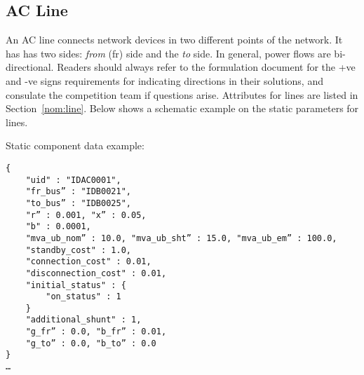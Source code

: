 \subsection{AC Line}
\label{sec:acline}
An AC line connects network devices in two different points of the network. 
It has has two sides: \emph{from} (fr) side and the \emph{to} side.
In general, power flows are bi-directional. 
Readers should always refer to the formulation document for the +ve and -ve signs
requirements for indicating directions in their solutions,
and consulate the competition team if questions arise.
Attributes for lines are listed in Section~\ref{nom:line}.
Below shows a schematic example on the static parameters for lines.

Static component data example:
\begin{verbatim}
{
    "uid" : "IDAC0001",
    "fr_bus” : "IDB0021",
    "to_bus” : "IDB0025",
    "r” : 0.001, "x” : 0.05, 
    "b" : 0.0001,
    "mva_ub_nom” : 10.0, "mva_ub_sht” : 15.0, "mva_ub_em” : 100.0,
    "standby_cost" : 1.0,
    "connection_cost" : 0.01,
    "disconnection_cost" : 0.01,
    "initial_status" : {
        "on_status" : 1
    }
    "additional_shunt" : 1,
    "g_fr” : 0.0, "b_fr” : 0.01,
    "g_to” : 0.0, "b_to” : 0.0    
}
…     
\end{verbatim}


